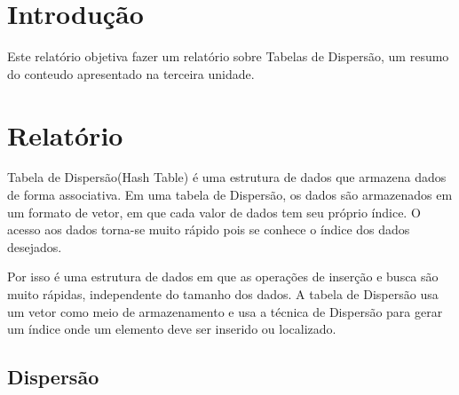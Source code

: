 \documentclass[a4paper, 12pt]{article}
\begin{document}
	\newpage
	\section{Introdução}
	
		Este relatório objetiva fazer um relatório sobre Tabelas de Dispersão, um resumo do conteudo apresentado na terceira unidade.



	\section{Relatório}
	
Tabela de Dispersão(Hash Table) é uma estrutura de dados que armazena dados de forma associativa. Em uma tabela de Dispersão, os dados são armazenados em um formato de vetor, em que cada valor de dados tem seu próprio índice. O acesso aos dados torna-se muito rápido pois se conhece o índice dos dados desejados.

Por isso é uma estrutura de dados em que as operações de inserção e busca são muito rápidas, independente do tamanho dos dados. A tabela de Dispersão usa um vetor como meio de armazenamento e usa a técnica de Dispersão para gerar um índice onde um elemento deve ser inserido ou localizado.

\subsection{Dispersão}
\end{document}
